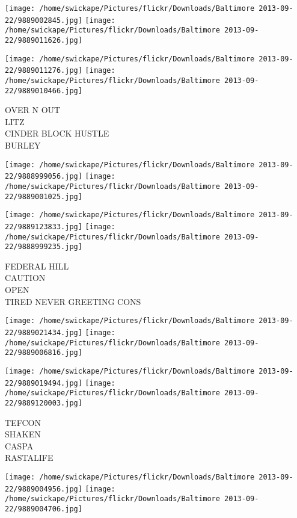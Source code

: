 \documentclass[10pt,letterpaper]{article}
\begin{document}
\texttt{[image: /home/swickape/Pictures/flickr/Downloads/Baltimore 2013-09-22/9889002845.jpg]}
\texttt{[image: /home/swickape/Pictures/flickr/Downloads/Baltimore 2013-09-22/9889011626.jpg]}

\texttt{[image: /home/swickape/Pictures/flickr/Downloads/Baltimore 2013-09-22/9889011276.jpg]}
\texttt{[image: /home/swickape/Pictures/flickr/Downloads/Baltimore 2013-09-22/9889010466.jpg]}

OVER N OUT\\
LITZ\\
CINDER BLOCK HUSTLE\\
BURLEY\\
\pagebreak

\texttt{[image: /home/swickape/Pictures/flickr/Downloads/Baltimore 2013-09-22/9888999056.jpg]}
\texttt{[image: /home/swickape/Pictures/flickr/Downloads/Baltimore 2013-09-22/9889001025.jpg]}

\texttt{[image: /home/swickape/Pictures/flickr/Downloads/Baltimore 2013-09-22/9889123833.jpg]}
\texttt{[image: /home/swickape/Pictures/flickr/Downloads/Baltimore 2013-09-22/9888999235.jpg]}

FEDERAL HILL\\
CAUTION\\
OPEN\\
TIRED NEVER GREETING CONS\\
\pagebreak

\texttt{[image: /home/swickape/Pictures/flickr/Downloads/Baltimore 2013-09-22/9889021434.jpg]}
\texttt{[image: /home/swickape/Pictures/flickr/Downloads/Baltimore 2013-09-22/9889006816.jpg]}

\texttt{[image: /home/swickape/Pictures/flickr/Downloads/Baltimore 2013-09-22/9889019494.jpg]}
\texttt{[image: /home/swickape/Pictures/flickr/Downloads/Baltimore 2013-09-22/9889120003.jpg]}

TEFCON\\
SHAKEN\\
CASPA\\
RASTALIFE\\
\pagebreak

\texttt{[image: /home/swickape/Pictures/flickr/Downloads/Baltimore 2013-09-22/9889004956.jpg]}
\texttt{[image: /home/swickape/Pictures/flickr/Downloads/Baltimore 2013-09-22/9889004706.jpg]}
\end{document}
